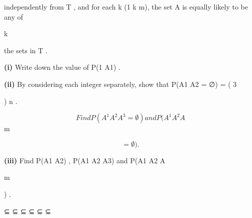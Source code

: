 \documentclass[12pt]{article}
\begin{document}
\begin{flushleft}
independently from T , and for each k (1 \geq k \geq m), the set A is equally likely to be any of\par
k\par
the sets in T .\par
\textbf{(i)} Write down the value of P(1 A1) .\par
\in\par
\textbf{(ii)} By considering each integer separately, show that P(A1 A2 = ∅) = ( 3\par
) n .\par
\cap\par
\[Find P(A^1 A^2 A^3 = ∅) and P(A^1 A^2 A\]
m\par
\[= ∅) .\]
\cap \cap \cap \cap \cdots \cap\par
\textbf{(iii)} Find P(A1 A2) , P(A1 A2 A3) and P(A1 A2 A\par
m\par
) .\par
⊆ ⊆ ⊆ ⊆ ⊆ \cdots ⊆\par
\end{flushleft}
\end{document}
